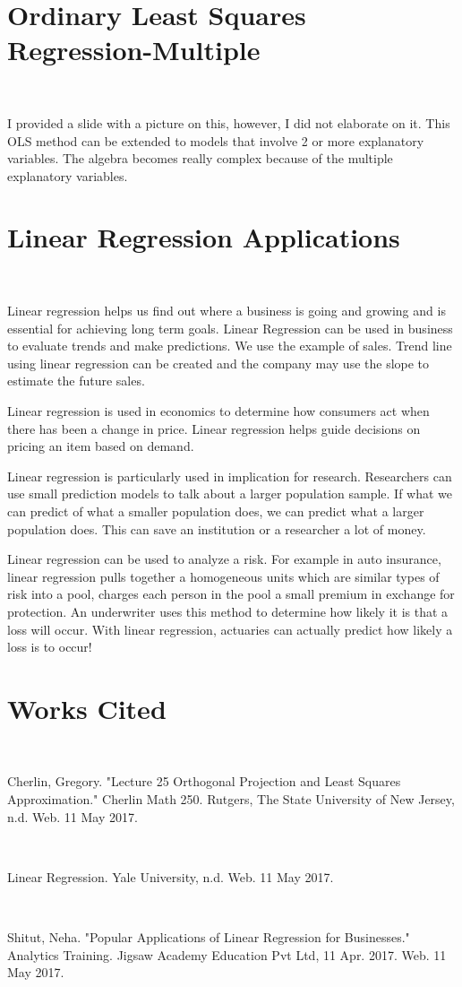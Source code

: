 \documentclass{article}
\begin{document}
\section{Ordinary Least Squares Regression-Multiple}

\

I provided a slide with a picture on this, however, I did not elaborate on it. This OLS method can be extended to models that involve 2 or more explanatory variables. The algebra becomes really complex because of the multiple explanatory variables.

\section{Linear Regression Applications}

\

Linear regression helps us find out where a business is going and growing and is essential for achieving long term goals. Linear Regression can be used in business to evaluate trends and make predictions. We use the example of sales. Trend line using linear regression can be created and the company may use the slope to estimate the future sales. 

Linear regression is used in economics to determine how consumers act when there has been a change in price.  Linear regression helps guide decisions on pricing an item based on demand.

Linear regression is particularly used in implication for research.  Researchers can use small prediction models to talk about a larger population sample. If what we can predict of what a smaller population does, we can predict what a larger population does. This can save an institution or a researcher a lot of money.

Linear regression can be used to analyze a risk. For example in auto insurance, linear regression pulls together a homogeneous units which are similar types of risk into a pool, charges each person in the pool a small premium in exchange for protection. An underwriter uses this method to determine how likely it is that a loss will occur. With linear regression, actuaries can actually predict how likely a loss is to occur!

\section{Works Cited}

\

Cherlin, Gregory. "Lecture 25 Orthogonal Projection and Least Squares Approximation." Cherlin Math 250. Rutgers, The State University of New Jersey, n.d. Web. 11 May 2017.

\

Linear Regression. Yale University, n.d. Web. 11 May 2017.

\

Shitut, Neha. "Popular Applications of Linear Regression for Businesses." Analytics
Training. Jigsaw Academy Education Pvt Ltd, 11 Apr. 2017. Web. 11 May 2017.
\end{document}
